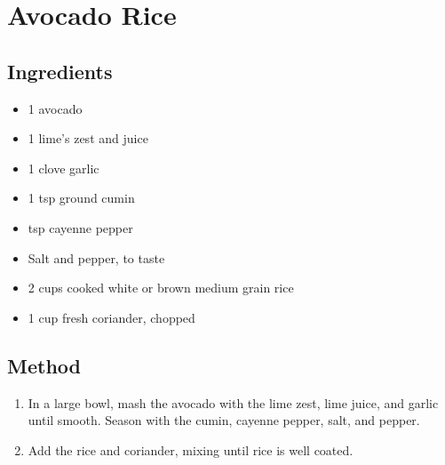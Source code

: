 \clearpage
\section{Avocado Rice}

\begin{multicols}{2}
  \subsection{Ingredients}
    \begin{itemize}
      \item 1 avocado
      \item 1 lime's zest and juice
      \item 1 clove garlic
      \item 1 tsp ground cumin
      \item {} tsp cayenne pepper
      \item Salt and pepper, to taste
      \item 2 cups cooked white or brown medium grain rice
      \item 1 cup fresh coriander, chopped
    \end{itemize}
  \vfill\null
  \columnbreak
  \subsection{Method}
    \begin{enumerate}
      \item In a large bowl, mash the avocado with the lime zest, lime juice, and garlic until smooth. Season with the cumin, cayenne pepper, salt, and pepper.
      \item Add the rice and coriander, mixing until rice is well coated.
    \end{enumerate}
  \end{multicols}
